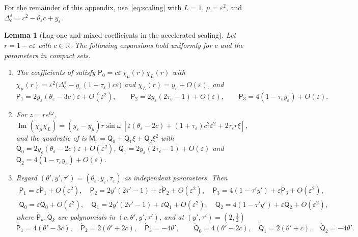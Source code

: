 \documentclass[11pt]{article}
\newtheorem{lemma}[theorem]{Lemma}
\theoremstyle{definition}
\theoremstyle{remark}
\newcommand{\R}{\mathbb R}
\newcommand{\sfP}{\mathsf P}
\newcommand{\Ima}{\operatorname{Im}}
\begin{document}
For the remainder of this appendix, use~\eqref{eq:scaling} with \(L=1\),
\(\mu=\varepsilon^2\), and \(\Delta^\varepsilon_c=c^2-\theta_\varepsilon c+y_\varepsilon\).

\begin{lemma}[Lag-one and mixed coefficients in the accelerated scaling]\label{lem:Pscaled}
Let \(r=1-c\varepsilon\) with \(c\in\R\).  The following expansions hold uniformly for \(c\) and the parameters in compact sets.
\begin{enumerate}[label=\textup{(\alph*)}]
\item The coefficients of  satisfy
\(\sfP_0=c\varepsilon\,\chi_\mu(r)\chi_L(r)\) with
\(\chi_\mu(r)=\varepsilon^2\bigl(\Delta_c^\varepsilon-y_\varepsilon(1+\tau_\varepsilon)c\varepsilon\bigr)\) and
\(\chi_L(r)=y_\varepsilon+O(\varepsilon)\), and
\[
\sfP_1=2y_\varepsilon(\theta_\varepsilon-3c)\varepsilon+O(\varepsilon^2),\qquad
\sfP_2=2y_\varepsilon(2\tau_\varepsilon-1)+O(\varepsilon),\qquad
\sfP_3=4(1-\tau_\varepsilon y_\varepsilon)+O(\varepsilon).
\]
\item For \(z=re^{i\omega}\),
\(\Ima(\chi_\mu\overline{\chi_L})=(y_\varepsilon-y_\mu)r\sin\omega\,[\varepsilon(\theta_\varepsilon-2c)+(1+\tau_\varepsilon)c^2\varepsilon^2+2\tau_\varepsilon r\xi]\),
and the quadratic of  is \(\mathsf M_r=\mathsf Q_0+\mathsf Q_1\xi+\mathsf Q_2\xi^2\) with
\(\mathsf Q_0=2y_\varepsilon(\theta_\varepsilon-2c)\varepsilon+O(\varepsilon^2)\),
\(\mathsf Q_1=2y_\varepsilon(2\tau_\varepsilon-1)+O(\varepsilon)\) and \(\mathsf Q_2=4(1-\tau_\varepsilon y_\varepsilon)+O(\varepsilon)\).
\item Regard \((\theta',y',\tau')=(\theta_\varepsilon,y_\varepsilon,\tau_\varepsilon)\) as independent parameters.  Then
\[
\begin{gathered}
\sfP_1=\varepsilon \dot{\mathsf P}_1+O(\varepsilon^2),\quad \sfP_2=2y'(2\tau'-1)+\varepsilon \dot{\mathsf P}_2+O(\varepsilon^2),\quad \sfP_3=4(1-\tau'y')+\varepsilon \dot{\mathsf P}_3+O(\varepsilon^2),\\
\mathsf Q_0=\varepsilon \dot{\mathsf Q}_0+O(\varepsilon^2),\quad \mathsf Q_1=2y'(2\tau'-1)+\varepsilon \dot{\mathsf Q}_1+O(\varepsilon^2),\quad \mathsf Q_2=4(1-\tau'y')+\varepsilon \dot{\mathsf Q}_2+O(\varepsilon^2),
\end{gathered}
\]
where \(\dot{\mathsf P}_k,\dot{\mathsf Q}_k\) are polynomials in \((c,\theta',y',\tau')\), and at \((y',\tau')=(2,\frac12)\)
\[
\dot{\mathsf P}_1=4(\theta'-3c),\quad \dot{\mathsf P}_2=2(\theta'+2c),\quad \dot{\mathsf P}_3=-4\theta',\qquad \dot{\mathsf Q}_0=4(\theta'-2c),\quad \dot{\mathsf Q}_1=2(\theta'+c),\quad \dot{\mathsf Q}_2=-4\theta' .
\]
\end{enumerate}
\end{lemma}
\end{document}
